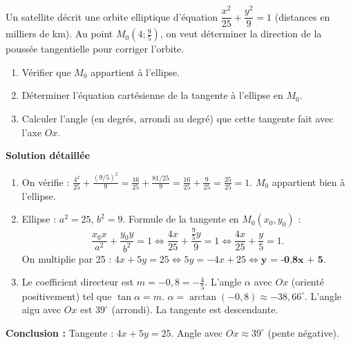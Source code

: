 \documentclass[11pt]{article}
\begin{document}
\begin{exoresolu}
Un satellite décrit une orbite elliptique d'équation $\dfrac{x^2}{25} + \dfrac{y^2}{9} = 1$ (distances en milliers de km). Au point $M_0(4 ; \frac{9}{5})$, on veut déterminer la direction de la poussée tangentielle pour corriger l'orbite.
\begin{enumerate}
    \item Vérifier que $M_0$ appartient à l'ellipse.
    \item Déterminer l'équation cartésienne de la tangente à l'ellipse en $M_0$.
    \item Calculer l'angle (en degrés, arrondi au degré) que cette tangente fait avec l'axe $Ox$.
\end{enumerate}
\tcblower
\textbf{Solution détaillée}
\begin{enumerate}
    \item On vérifie : $\frac{4^2}{25} + \frac{(9/5)^2}{9} = \frac{16}{25} + \frac{81/25}{9} = \frac{16}{25} + \frac{9}{25} = \frac{25}{25} = 1$. $M_0$ appartient bien à l'ellipse.
    \item Ellipse : $a^2=25$, $b^2=9$. Formule de la tangente en $M_0(x_0,y_0)$ :
    \[ \frac{x_0 x}{a^2} + \frac{y_0 y}{b^2} = 1 \iff \frac{4x}{25} + \frac{\frac{9}{5}y}{9} = 1 \iff \frac{4x}{25} + \frac{y}{5} = 1. \]
    On multiplie par 25 : $4x + 5y = 25 \iff 5y = -4x + 25 \iff \textbf{y = -0,8x + 5}$.
    \item Le coefficient directeur est $m = -0,8 = -\frac{4}{5}$.
    L'angle $\alpha$ avec $Ox$ (orienté positivement) tel que $\tan \alpha = m$.
    $\alpha = \arctan(-0,8) \approx -38,66^\circ$.
    L'angle aigu avec $Ox$ est $39^\circ$ (arrondi). La tangente est descendante.
\end{enumerate}
\textbf{Conclusion :} Tangente : $4x+5y=25$. Angle avec $Ox \approx 39^\circ$ (pente négative).
\end{exoresolu}
\end{document}
